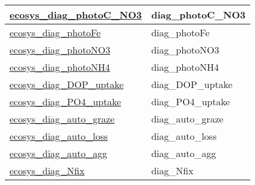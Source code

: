 {\begin{center}
\begin{longtable}{| p{2.0in} | p{4.0in} |}
    \hline
    \hyperref[subsec:var_sec_ecosysDiagFieldsLevel2_ecosys_diag_photoC_NO3]{ecosys\_diag\_photoC\_NO3} & diag\_photoC\_NO3 \\
    \hline
    \hyperref[subsec:var_sec_ecosysDiagFieldsLevel2_ecosys_diag_photoFe]{ecosys\_diag\_photoFe} & diag\_photoFe \\
    \hline
    \hyperref[subsec:var_sec_ecosysDiagFieldsLevel2_ecosys_diag_photoNO3]{ecosys\_diag\_photoNO3} & diag\_photoNO3 \\
    \hline
    \hyperref[subsec:var_sec_ecosysDiagFieldsLevel2_ecosys_diag_photoNH4]{ecosys\_diag\_photoNH4} & diag\_photoNH4 \\
    \hline
    \hyperref[subsec:var_sec_ecosysDiagFieldsLevel2_ecosys_diag_DOP_uptake]{ecosys\_diag\_DOP\_uptake} & diag\_DOP\_uptake \\
    \hline
    \hyperref[subsec:var_sec_ecosysDiagFieldsLevel2_ecosys_diag_PO4_uptake]{ecosys\_diag\_PO4\_uptake} & diag\_PO4\_uptake \\
    \hline
    \hyperref[subsec:var_sec_ecosysDiagFieldsLevel2_ecosys_diag_auto_graze]{ecosys\_diag\_auto\_graze} & diag\_auto\_graze \\
    \hline
    \hyperref[subsec:var_sec_ecosysDiagFieldsLevel2_ecosys_diag_auto_loss]{ecosys\_diag\_auto\_loss} & diag\_auto\_loss \\
    \hline
    \hyperref[subsec:var_sec_ecosysDiagFieldsLevel2_ecosys_diag_auto_agg]{ecosys\_diag\_auto\_agg} & diag\_auto\_agg \\
    \hline
    \hyperref[subsec:var_sec_ecosysDiagFieldsLevel2_ecosys_diag_Nfix]{ecosys\_diag\_Nfix} & diag\_Nfix \\
    \hline
\end{longtable}
\end{center}
}
